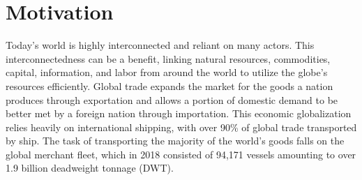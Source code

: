\documentclass[twoside,symmetric,notoc]{tufte-book}
\begin{document}
\tableofcontents
\listoffigures
\listoftables

\glsaddall
\printglossary[type=\acronymtype,title=Glossary]

\mainmatter
{}


\chapter{Motivation}
\label{motivation}
\par{%
Today's world is highly interconnected and reliant on many actors. This interconnectedness can be a benefit, linking natural resources, commodities, capital, information, and labor from around the world to utilize the globe's resources efficiently. Global trade expands the market for the goods a nation produces through exportation and allows a portion of domestic demand to be better met by a foreign nation through importation.\cite{OECD_2011} This economic globalization relies heavily on international shipping, with over 90\% of global trade transported by ship.\cite{MKC} The task of transporting the majority of the world's goods falls on the global merchant fleet, which in 2018 consisted of 94,171 vessels amounting to over 1.9 billion deadweight tonnage (DWT).\cite{UN_2018} 
}
\end{document}
